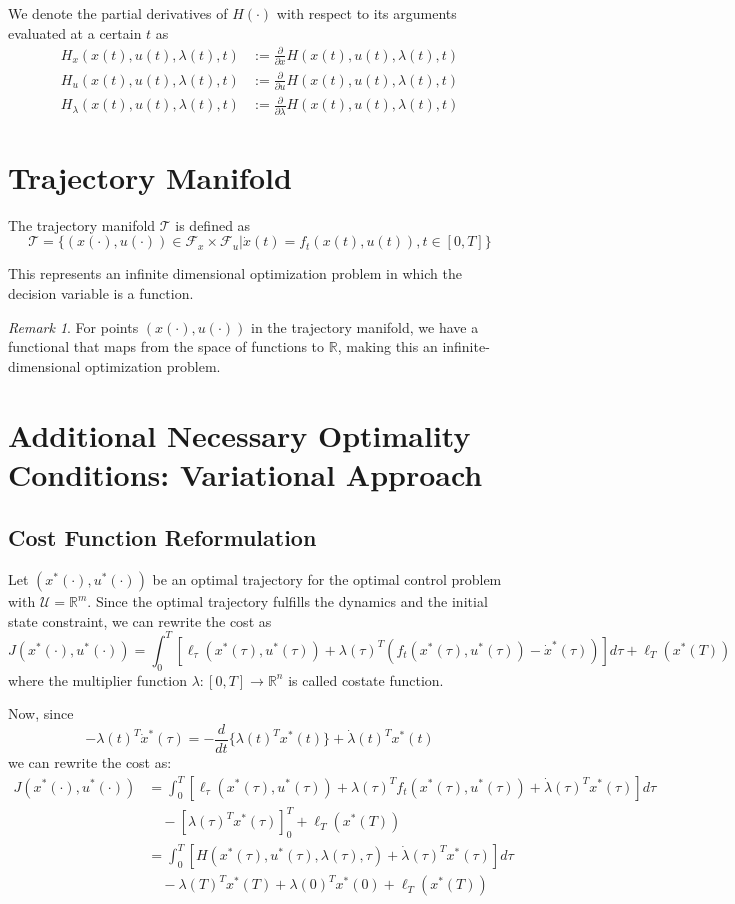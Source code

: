 \documentclass[openany]{book}
\theoremstyle{definition}
\theoremstyle{remark}
\newtheorem*{remark}{Remark}
\begin{document}
We denote the partial derivatives of $H(\cdot)$ with respect to its arguments evaluated at a certain $t$ as
\begin{align*}
    H_x(x(t),u(t),\lambda(t),t) &:= \frac{\partial}{\partial x}H(x(t),u(t),\lambda(t),t)\\
    H_u(x(t),u(t),\lambda(t),t) &:= \frac{\partial}{\partial u}H(x(t),u(t),\lambda(t),t)\\
    H_\lambda(x(t),u(t),\lambda(t),t) &:= \frac{\partial}{\partial \lambda}H(x(t),u(t),\lambda(t),t)
\end{align*}

\section{Trajectory Manifold}
The trajectory manifold $\mathcal{T}$ is defined as
\[
    \mathcal{T} = \{(x(\cdot),u(\cdot)) \in \mathcal{F}_x \times \mathcal{F}_u | \dot{x}(t) = f_t(x(t),u(t)), t \in [0,T]\}
\]

This represents an infinite dimensional optimization problem in which the decision variable is a function.

\begin{remark}
For points $(x(\cdot),u(\cdot))$ in the trajectory manifold, we have a functional that maps from the space of functions to $\mathbb{R}$, making this an infinite-dimensional optimization problem.
\end{remark}
\section{Additional Necessary Optimality Conditions: Variational Approach}

\subsection{Cost Function Reformulation}
Let $(x^*(\cdot),u^*(\cdot))$ be an optimal trajectory for the optimal control problem with $\mathcal{U} = \mathbb{R}^m$. Since the optimal trajectory fulfills the dynamics and the initial state constraint, we can rewrite the cost as
\[
    J(x^*(\cdot),u^*(\cdot)) = \int_0^T[\ell_\tau(x^*(\tau),u^*(\tau)) + \lambda(\tau)^T(f_t(x^*(\tau),u^*(\tau)) - \dot{x}^*(\tau))]d\tau + \ell_T(x^*(T))
\]
where the multiplier function $\lambda:[0,T]\to\mathbb{R}^n$ is called costate function.

Now, since
\[
    -\lambda(t)^T\dot{x}^*(\tau) = -\frac{d}{dt}\{\lambda(t)^Tx^*(t)\} + \dot{\lambda}(t)^Tx^*(t)
\]
we can rewrite the cost as:
\begin{align*}
    J(x^*(\cdot),u^*(\cdot)) &= \int_0^T[\ell_\tau(x^*(\tau),u^*(\tau)) + \lambda(\tau)^Tf_t(x^*(\tau),u^*(\tau)) + \dot{\lambda}(\tau)^Tx^*(\tau)]d\tau\\
    &\quad -[\lambda(\tau)^Tx^*(\tau)]_0^T + \ell_T(x^*(T))\\
    &= \int_0^T[H(x^*(\tau),u^*(\tau),\lambda(\tau),\tau) + \dot{\lambda}(\tau)^Tx^*(\tau)]d\tau\\
    &\quad -\lambda(T)^Tx^*(T) + \lambda(0)^Tx^*(0) + \ell_T(x^*(T))
\end{align*}
\end{document}
